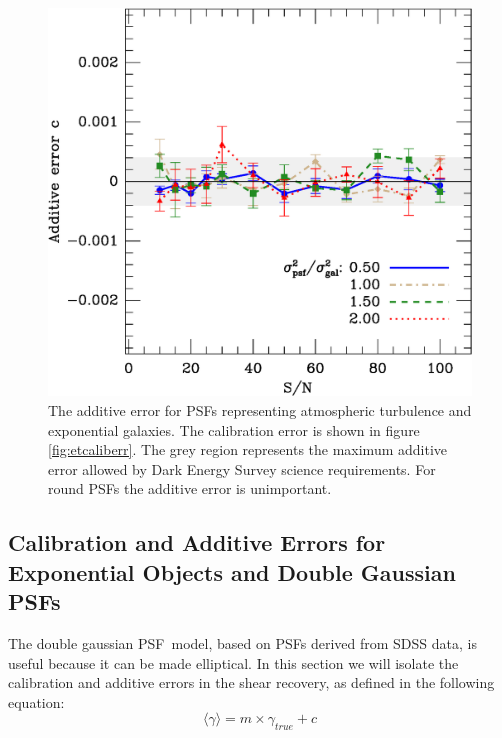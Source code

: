 \documentclass[10pt,preprint]{aastex}
\newcommand{\psf}{PSF}
\begin{document}
\begin{figure}[t] \centering
 \centering 
 \includegraphics[scale=0.65]{figures/set-s2n-et01-c-vs-shear.eps}

 \caption{The additive error for \psf s representing atmospheric turbulence and
 exponential galaxies.  The calibration error is shown in figure
 \ref{fig:etcaliberr}.  The grey region represents the maximum additive error
 allowed by Dark Energy Survey science requirements.  For round \psf s the
 additive error is unimportant. } 

 \label{fig:etverifyadditive}
\end{figure}





\subsection{Calibration and Additive Errors for Exponential Objects and Double
Gaussian \psf s}

The double gaussian \psf\ model, based on \psf s derived from SDSS data, is
useful because it can be made elliptical.  In this section we will isolate the
calibration and additive errors in the shear recovery, as defined in the
following equation:
\begin{equation}
\langle \gamma \rangle = m\times \gamma_{true} + c
\end{equation}
\end{document}
